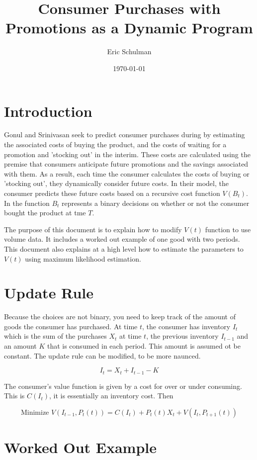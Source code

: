 \documentclass{article}
\title{Consumer Purchases with Promotions as a Dynamic Program}
\author{Eric Schulman}
\date{\today}
\begin{document}
\maketitle

\section{Introduction}
Gonul and Srinivasan seek to predict consumer purchases during by estimating the associated costs of buying the product, and the costs of waiting for a promotion and 'stocking out' in the interim. These costs are calculated using the premise that consumers anticipate future promotions and the savings associated with them. As a result, each time the consumer calculates the costs of buying or 'stocking out', they dynamically consider future costs. In their model, the consumer predicts these future costs based on a recursive cost function $V(B_t)$. In the function $B_t$ represents a binary decisions on whether or not the consumer bought the product at tme $T$.

The purpose of this document is to explain how to modify $V(t)$ function to use volume data. It includes a worked out example of one good with two periods. This document also explains at a high level how to estimate the parameters to $V(t)$ using maximum likelihood estimation.


\section{Update Rule}

Because the choices are not binary, you need to keep track of the amount of goods the consumer has purchased. At time $t$, the consumer has inventory $I_t$ which is the sum of the purchases $X_t$ at time $t$, the previous inventory $I_{t-1}$ and an amount $K$ that is consumed in each period. This amount is assumed ot be constant. The update rule can be modified, to be more naunced. 

$$I_t = X_t + I_{t-1} - K$$

The consumer's value function is given by a cost for over or under consuming. This is $C(I_t)$, it is essentially an inventory cost. Then 



$$\text{Minimize } V(I_{t-1}, P_t(t)) = C(I_t) + P_t(t) X_t + V(I_t, P_{t+1}(t) ) $$

\section{Worked Out Example}
\end{document}

